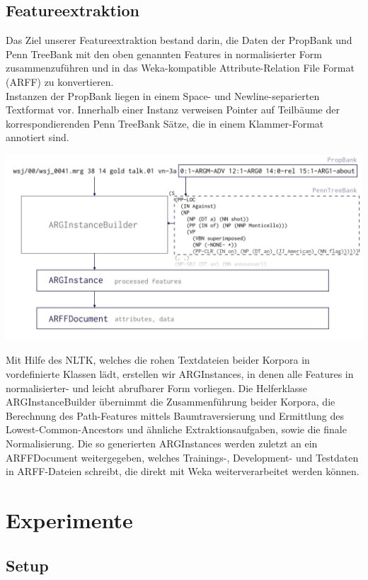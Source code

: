 \documentclass[]{article}
\begin{document}
\subsection{Featureextraktion}
Das Ziel unserer Featureextraktion bestand darin, die Daten der PropBank und Penn TreeBank mit den oben genannten Features in normalisierter Form zusammenzuführen und in das Weka-kompatible Attribute-Relation File Format (ARFF) zu konvertieren.\\
Instanzen der PropBank liegen in einem Space- und Newline-separierten Textformat vor. Innerhalb einer Instanz verweisen Pointer auf Teilbäume der korrespondierenden Penn TreeBank Sätze, die in einem Klammer-Format annotiert sind.
\begin{center}
	\includegraphics[scale=0.23]{argext_graphic.png}
\end{center}
Mit Hilfe des NLTK, welches die rohen Textdateien beider Korpora in vordefinierte Klassen lädt, erstellen wir ARGInstances, in denen alle Features in normalisierter- und leicht abrufbarer Form vorliegen. Die Helferklasse ARGInstanceBuilder übernimmt die Zusammenführung beider Korpora, die Berechnung des Path-Features mittels Baumtraversierung und Ermittlung des Lowest-Common-Ancestors und ähnliche Extraktionsaufgaben, sowie die finale Normalisierung. Die so generierten ARGInstances werden zuletzt an ein ARFFDocument weitergegeben, welches Trainings-, Development- und Testdaten in ARFF-Dateien schreibt, die direkt mit Weka weiterverarbeitet werden können.

\section{Experimente}
\subsection{Setup}
\end{document}
